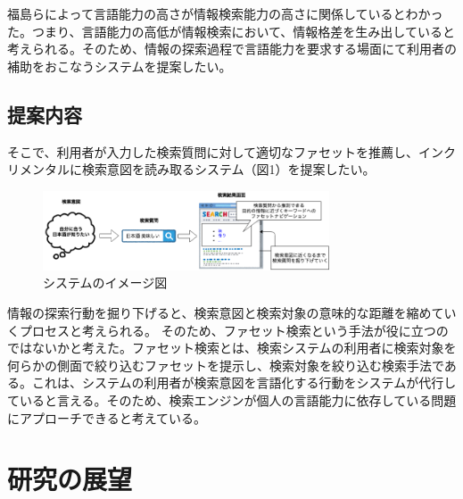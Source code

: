 \documentclass[a4j,10pt, twocolumn]{jarticle}
\begin{document}
 福島らによって言語能力の高さが情報検索能力の高さに関係しているとわかった\cite{fukushima}。つまり、言語能力の高低が情報検索において、情報格差を生み出していると考えられる。そのため、情報の探索過程で言語能力を要求する場面にて利用者の補助をおこなうシステムを提案したい。
\subsection{提案内容}

 そこで、利用者が入力した検索質問に対して適切なファセットを推薦し、インクリメンタルに検索意図を読み取るシステム（図1）を提案したい。

 \begin{figure}[h]
   \includegraphics[width=85mm]{./new_ir_with_navi.png}
   \caption{システムのイメージ図}
 \end{figure}
 
 情報の探索行動を掘り下げると、検索意図と検索対象の意味的な距離を縮めていくプロセスと考えられる。 そのため、ファセット検索という手法が役に立つのではないかと考えた。ファセット検索とは、検索システムの利用者に検索対象を何らかの側面で絞り込むファセットを提示し、検索対象を絞り込む検索手法である\cite{faceted}。これは、システムの利用者が検索意図を言語化する行動をシステムが代行していると言える。そのため、検索エンジンが個人の言語能力に依存している問題にアプローチできると考えている。
\section{研究の展望}
\end{document}
